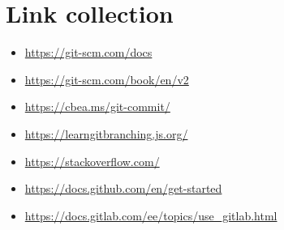 \section{Link collection}
\begin{frame}
	\begin{itemize}
		\item \url{https://git-scm.com/docs}
		\item \url{https://git-scm.com/book/en/v2}
		\item \url{https://cbea.ms/git-commit/}
		\item \url{https://learngitbranching.js.org/}
		\item \url{https://stackoverflow.com/}
		\item \url{https://docs.github.com/en/get-started}
		\item \url{https://docs.gitlab.com/ee/topics/use_gitlab.html}
	\end{itemize}
\end{frame}

